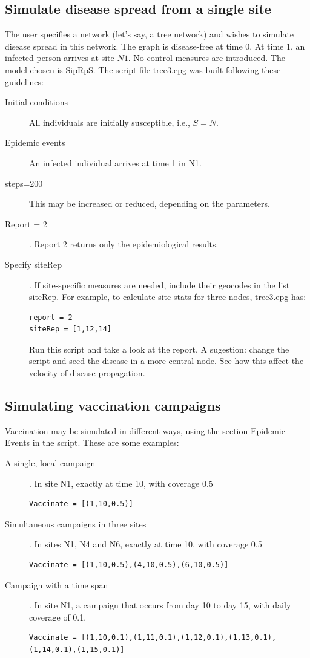 \subsection{Simulate disease spread from a single site}
The user specifies a network (let's say, a tree network) and wishes to simulate disease spread in this network. The graph is disease-free at time 0. At time 1, an infected person arrives at site $N1$. No control measures are introduced. The model chosen is SipRpS. 
The script file tree3.epg was built following these guidelines:
\begin{description}
\item[Initial conditions] All individuals are initially susceptible, i.e.,  $S=N$.  
\item[Epidemic events] An infected individual arrives at time 1 in N1.
\item[steps=200] This may be increased or reduced, depending on the parameters.
\item[Report = 2]. Report 2 returns only the epidemiological results.
\item[Specify siteRep]. If site-specific measures are needed, include their geocodes in the list siteRep. For example, to calculate site stats for three nodes, tree3.epg has:
\begin{verbatim}
report = 2
siteRep = [1,12,14]
\end{verbatim}
Run this script and take a look at the report. A sugestion: change the script and seed the disease in a more central node. See how this affect the velocity of disease propagation.
\end{description}

\subsection{Simulating vaccination campaigns}
Vaccination may be simulated in different ways, using the section Epidemic Events in the script. These are some examples:
\begin{description}
\item[A single, local campaign].  In site N1, exactly at time 10, with coverage 0.5
\begin{verbatim}
Vaccinate = [(1,10,0.5)]
\end{verbatim}
\item[Simultaneous campaigns in three sites].  In sites N1, N4 and N6, exactly at time 10, with coverage 0.5
\begin{verbatim}
Vaccinate = [(1,10,0.5),(4,10,0.5),(6,10,0.5)]
\end{verbatim}
\item[Campaign with a time span].  In site N1, a campaign that occurs from day 10 to day 15, with daily coverage of 0.1.
\begin{verbatim}
Vaccinate = [(1,10,0.1),(1,11,0.1),(1,12,0.1),(1,13,0.1),
(1,14,0.1),(1,15,0.1)]
\end{verbatim}
\end{description}


